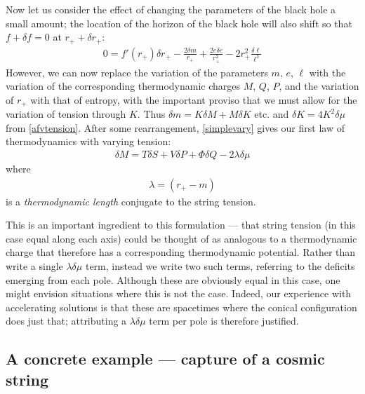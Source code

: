 \documentclass[
twoside,
openright,
frontopenright,
]{dmathesis}
\begin{document}
Now let us consider the effect of changing the parameters of the black hole
a small amount; the location of the horizon of the black hole will also shift
so that $f+\delta f= 0$ at $r_++\delta r_+ $:
\begin{align}
0= f'(r_+) \delta r_+ - \frac{2\delta m}{r_+} 
+ \frac{2e\delta e}{r_+^2}  - 2r_+^2 \frac{\delta \ell}{\ell^3}
\label{simplevary}
\end{align}
However, we can now replace the variation of the parameters $m$, $e$, $\ell$
with the variation of the corresponding thermodynamic charges $M$, $Q$, $P$, and
the variation of $r_+$ with that of entropy, with the important proviso that we
must allow for the variation of tension through $K$. Thus
$\delta m = K \delta M + M \delta K$ etc. and $\delta K = 4K^2\delta \mu$ from
\cref{afvtension}.  After some rearrangement, \cref{simplevary} gives our first
law of thermodynamics with varying tension:
\begin{align}
\delta M = T \delta S + V \delta P + \Phi \delta Q
-2 \lambda \delta\mu
\label{firstlawwithK}
\end{align}
where
\begin{align} 
\lambda = \left ( r_+ - m\right)
\label{TDlengthnoacc}
\end{align}
is a \emph{thermodynamic length} conjugate to the string tension.

This is an important ingredient to this formulation --- that string tension (in
this case equal along each axis) could be thought of as analogous to a
thermodynamic charge that therefore has a corresponding thermodynamic potential.
Rather than write a single $\lambda\delta\mu$ term, instead we write two such
terms, referring to the deficits emerging from each pole. Although these are
obviously equal in this case, one might envision situations where this is not
the case. Indeed, our experience with accelerating solutions is that these are
spacetimes where the conical configuration does just that; attributing a
$\lambda \delta \mu$ term per pole is therefore justified.

\subsection{A concrete example --- capture of a cosmic string}
\end{document}
